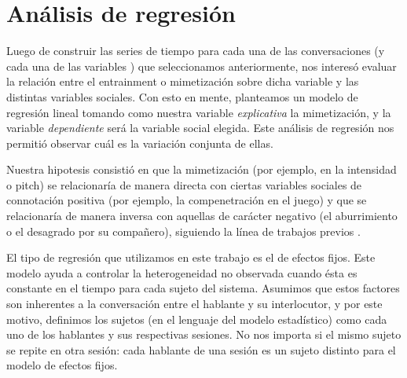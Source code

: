 \section{Análisis de regresión}

Luego de construir las series de tiempo para cada una de las conversaciones (y cada una de las variables \ap) que seleccionamos anteriormente, nos interesó evaluar la relación entre el entrainment o mimetización sobre dicha variable y las distintas variables sociales. Con esto en mente, planteamos un modelo de regresión lineal tomando como nuestra variable \emph{explicativa} la mimetización, y la variable \emph{dependiente} será la variable social elegida. Este análisis de regresión nos permitió observar cuál es la variación conjunta de ellas.

Nuestra hipotesis consistió en que la mimetización (por ejemplo, en la intensidad o pitch) se relacionaría de manera directa con ciertas variables sociales de connotación positiva (por ejemplo, la compenetración en el juego) y que se relacionaría de manera inversa con aquellas de carácter negativo (el aburrimiento o el desagrado por su compañero), siguiendo la línea de trabajos previos \cite{gravano2015backward}.

El tipo de regresión que utilizamos en este trabajo es el de efectos fijos. Este modelo \cite[chap 16]{gujarati1999} ayuda a controlar la heterogeneidad no observada cuando ésta es constante en el tiempo para cada sujeto del sistema. Asumimos que estos factores son inherentes a la conversación entre el hablante y su interlocutor, y por este motivo, definimos los sujetos (en el lenguaje del modelo estadístico) como cada uno de los hablantes y sus respectivas sesiones. No nos importa si el mismo sujeto se repite en otra sesión: cada hablante de una sesión es un sujeto distinto para el modelo de efectos fijos.

